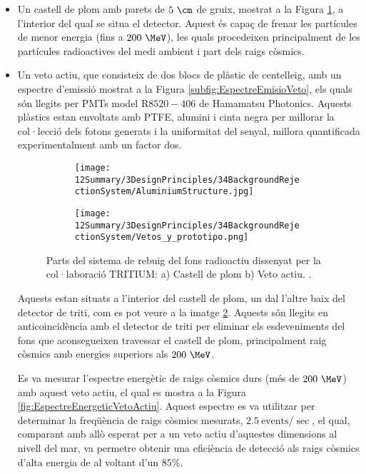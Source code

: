 \begin{itemize}

\item{} Un castell de plom amb parets de $5~\cm$ de gruix, mostrat a la Figura \ref{subfig:CastellPlom}, a l'interior del qual se situa el detector. Aquest és capaç de frenar les partícules de menor energia (fins a $200~\MeV$), les quals procedeixen principalment de les partícules radioactives del medi ambient i part dels raigs còsmics.

\item{} Un veto actiu, que consisteix de dos blocs de plàstic de centelleig, amb un espectre d'emissió mostrat a la Figura \ref{subfig:EspectreEmisioVeto}, els quals són llegits per PMTs model R$8520-406$ de Hamamatsu Photonics. Aquests plàstics estan envoltats amb PTFE, alumini i cinta negra per millorar la col·lecció dels fotons generats i la uniformitat del senyal, millora quantificada experimentalment amb un factor dos.

\begin{figure}
\centering
    \begin{subfigure}[b]{0.7\textwidth}
    \centering
    \texttt{[image: 12Summary/3DesignPrinciples/34BackgroundRejectionSystem/AluminiumStructure.jpg]}  
        \caption{}\label{subfig:CastellPlom}
    \end{subfigure}
    \hfill
    \begin{subfigure}[b]{0.7\textwidth}
    \centering
    \texttt{[image: 12Summary/3DesignPrinciples/34BackgroundRejectionSystem/Vetos\_y\_prototipo.png]}  
    \caption{\label{subfig:VetoActiu}}
    \end{subfigure}
\caption{Parts del sistema de rebuig del fons radioactiu dissenyat per la col·laboració TRITIUM: a) Castell de plom b) Veto actiu. \label{fig:SistemaRebuigFonsRadioactiu}.}
\end{figure}

Aquests estan situats a l'interior del castell de plom, un dal l'altre baix del detector de triti, com es pot veure a la imatge \ref{subfig:VetoActiu}. Aquests són llegits en anticoincidència amb el detector de triti per eliminar els esdeveniments del fons que aconsegueixen travessar el castell de plom, principalment raig còsmics amb energies superiors als $200~\MeV$. 

Es va mesurar l'espectre energètic de raigs còsmics durs (més de $200~\MeV$) amb aquest veto actiu, el qual es mostra a la Figura \ref{fig:EspectreEnergeticVetoActiu}. Aquest espectre es va utilitzar per determinar la freqüència de raigs còsmics mesurats, $2.5~\text{events}/\sec$, el qual, comparant amb allò esperat per a un veto actiu d'aquestes dimensions al nivell del mar, va permetre obtenir una eficiència de detecció als raigs còsmics d'alta energia de al voltant d'un $85\%$.


\end{itemize}
